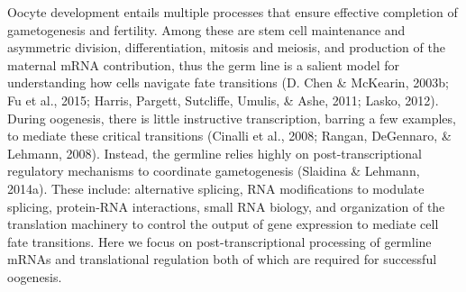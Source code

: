 \documentclass[12pt,twoside]{reedthesis}
\begin{document}
Oocyte development entails multiple processes that ensure effective
completion of gametogenesis and fertility. Among these are stem cell
maintenance and asymmetric division, differentiation, mitosis and
meiosis, and production of the maternal mRNA contribution, thus the germ
line is a salient model for understanding how cells navigate fate
transitions (D. Chen \& McKearin, 2003b; Fu et al., 2015; Harris, Pargett, Sutcliffe, Umulis, \& Ashe, 2011; Lasko, 2012).
During oogenesis, there is little instructive transcription, barring a
few examples, to mediate these critical transitions (Cinalli et al., 2008; Rangan, DeGennaro, \& Lehmann, 2008). Instead, the germline relies highly on
post-transcriptional regulatory mechanisms to coordinate gametogenesis
(Slaidina \& Lehmann, 2014a). These include: alternative splicing, RNA
modifications to modulate splicing, protein-RNA interactions, small RNA
biology, and organization of the translation machinery to control the
output of gene expression to mediate cell fate transitions. Here we
focus on post-transcriptional processing of germline mRNAs and
translational regulation both of which are required for successful
oogenesis.
\end{document}
